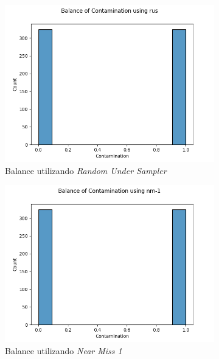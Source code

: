 \begin{figure}[!ht]
    \centering
    \begin{subfigure}[b]{0.3\textwidth}
        \centering
        \includegraphics[width=\textwidth]{media/images/under-sampling/rus.png}
        \caption{Balance utilizando \textit{Random Under Sampler}}
    \end{subfigure}
    \begin{subfigure}[b]{0.3\textwidth}
        \centering
        \includegraphics[width=\textwidth]{media/images/under-sampling/nm-1.png}
        \caption{Balance utilizando \textit{Near Miss 1}}
    \end{subfigure}
    \begin{subfigure}[b]{0.3\textwidth}

\end{subfigure}
\end{figure}
